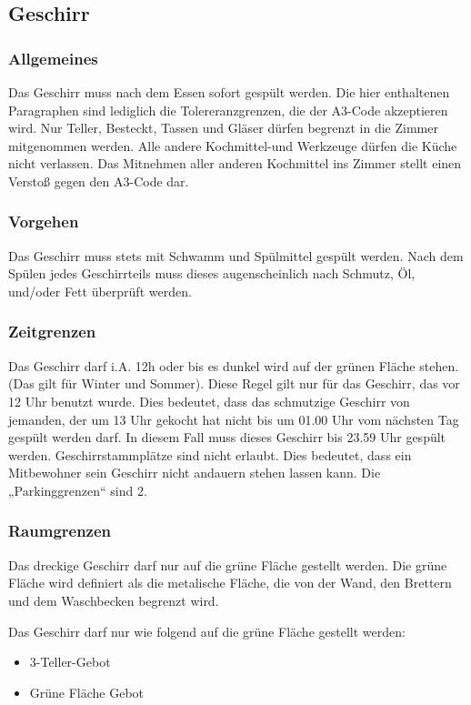\documentclass[10pt,a4paper,final]{article}
\begin{document}
\subsection{Geschirr}
\subsubsection{Allgemeines}
Das Geschirr muss nach dem Essen sofort gespült werden. Die hier enthaltenen Paragraphen sind lediglich die Tolereranzgrenzen, die der A3-Code akzeptieren wird. Nur Teller, Besteckt, Tassen und Gläser dürfen begrenzt in die Zimmer mitgenommen werden. Alle andere Kochmittel-und Werkzeuge dürfen die Küche nicht verlassen. Das Mitnehmen aller anderen Kochmittel ins Zimmer stellt einen Verstoß gegen den A3-Code dar.
\subsubsection{Vorgehen}
Das Geschirr muss stets mit Schwamm und Spülmittel gespült werden. Nach dem Spülen jedes Geschirrteils muss dieses augenscheinlich nach Schmutz, Öl, und/oder Fett überprüft werden.
\subsubsection{Zeitgrenzen}
Das Geschirr darf i.A. 12h oder bis es dunkel wird auf der grünen Fläche stehen. (Das gilt für Winter und Sommer). Diese Regel gilt nur für das Geschirr, das vor 12 Uhr benutzt wurde. Dies bedeutet, dass das schmutzige Geschirr von jemanden, der um 13 Uhr gekocht hat nicht bis um 01.00 Uhr vom nächsten Tag gespült werden darf. In diesem Fall muss dieses Geschirr bis 23.59 Uhr gespült werden. Geschirrstammplätze sind nicht erlaubt. Dies bedeutet, dass ein Mitbewohner sein Geschirr nicht andauern stehen lassen kann. Die „Parkinggrenzen“ sind 2. 
\subsubsection{Raumgrenzen}
Das dreckige Geschirr darf nur auf die grüne Fläche gestellt werden. Die grüne Fläche wird definiert als die metalische Fläche, die von der Wand, den Brettern und dem Waschbecken begrenzt wird.
\vspace{1cm}


\vspace{1cm}
Das Geschirr darf nur wie folgend auf die grüne Fläche gestellt werden:
\begin{itemize}
\item 3-Teller-Gebot
\item Grüne Fläche Gebot
\vspace{1cm}

\end{itemize}
\end{document}
